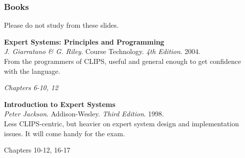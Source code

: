 \documentclass[xcolor={usenames,dvipsnames,svgnames}, compress]{beamer}
\begin{document}
\begin{frame}
  \frametitle{Books}
  Please do not study from these slides.\par\bigskip
  
  
  \textbf{Expert Systems: Principles and Programming}\\
  \emph{J. Giarratano \& G. Riley}. Course Technology. \emph{4th
  Edition}. 2004.\\
  From the programmers of CLIPS, useful and general enough to get
  confidence with the language.
  \begin{flushright}
    \vspace{-5pt}
    \emph{Chapters 6-10, 12}
  \end{flushright}
  
  
  
  \textbf{Introduction to Expert Systems}\\
  \emph{Peter Jackson}. Addison-Wesley. \emph{Third Edition}. 1998.\\
  Less CLIPS-centric, but heavier on expert system design and
  implementation issues. It will come handy for the exam.
  \begin{flushright}
    \vspace{-5pt}
    Chapters 10-12, 16-17
  \end{flushright}
  
  
\end{frame}
\end{document}
